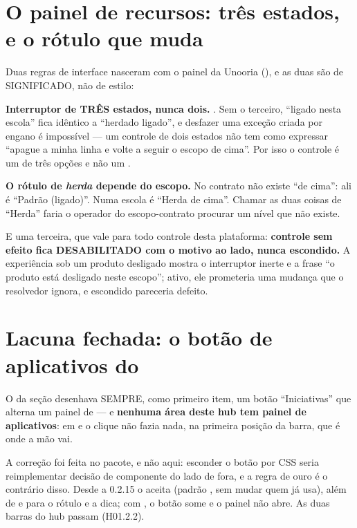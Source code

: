 \section{O painel de recursos: três estados, e o rótulo que muda}

Duas regras de interface nasceram com o painel da Unooria (), e as
duas são de SIGNIFICADO, não de estilo:

\textbf{Interruptor de TRÊS estados, nunca dois.} . Sem o terceiro, \enquote{ligado nesta escola} fica idêntico a
\enquote{herdado ligado}, e desfazer uma exceção criada por engano é impossível
--- um controle de dois estados não tem como expressar \enquote{apague a minha
linha e volte a seguir o escopo de cima}. Por isso o controle é um
 de três opções e não um .

\textbf{O rótulo de \emph{herda} depende do escopo.} No contrato não existe
\enquote{de cima}: ali é \enquote{Padrão (ligado)}. Numa escola é \enquote{Herda
de cima}. Chamar as duas coisas de \enquote{Herda} faria o operador do
escopo-contrato procurar um nível que não existe.

E uma terceira, que vale para todo controle desta plataforma: \textbf{controle
sem efeito fica DESABILITADO com o motivo ao lado, nunca escondido.} A
experiência sob um produto desligado mostra o interruptor inerte e a frase
\enquote{o produto está desligado neste escopo}; ativo, ele prometeria uma
mudança que o resolvedor ignora, e escondido pareceria defeito.

\section{Lacuna fechada: o botão de aplicativos do }

O  da seção  desenhava SEMPRE, como primeiro item, um
botão \enquote{Iniciativas} que alterna um painel de  --- e
\textbf{nenhuma área deste hub tem painel de aplicativos}: em  e
 o clique não fazia nada, na primeira posição da barra, que é
onde a mão vai.

A correção foi feita no pacote, e não aqui: esconder o botão por CSS seria
reimplementar decisão de componente do lado de fora, e a regra de ouro é o
contrário disso. Desde a 0.2.15 o  aceita  (padrão
, sem mudar quem já usa), além de  e 
para o rótulo e a dica; com , o botão some e o painel não abre. As
duas barras do hub passam  (H01.2.2).

